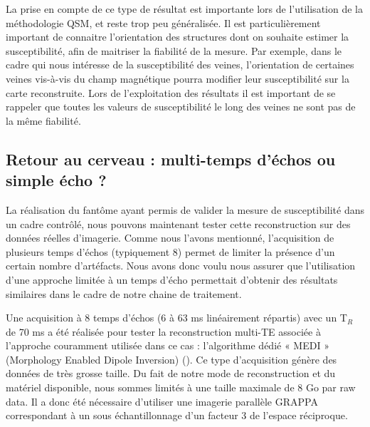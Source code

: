 {La prise en compte de ce type de résultat est importante lors de l’utilisation de la méthodologie
QSM, et reste trop peu généralisée. Il est particulièrement important de connaitre l’orientation des
structures dont on souhaite estimer la susceptibilité, afin de maitriser la fiabilité de la mesure. Par
exemple, dans le cadre qui nous intéresse de la susceptibilité des veines, l’orientation de certaines
veines vis-à-vis du champ magnétique pourra modifier leur susceptibilité sur la carte reconstruite. Lors
de l’exploitation des résultats il est important de se rappeler que toutes les valeurs de susceptibilité le
long des veines ne sont pas de la même fiabilité.
\subsection{Retour au cerveau : multi-temps d’échos ou simple écho ?}
La réalisation du fantôme ayant permis de valider la mesure de susceptibilité dans un cadre
contrôlé, nous pouvons maintenant tester cette reconstruction sur des données réelles d’imagerie.
Comme nous l’avons mentionné, l’acquisition de plusieurs temps d’échos (typiquement 8) permet de
limiter la présence d’un certain nombre d’artéfacts. Nous avons donc voulu nous assurer que
l’utilisation d’une approche limitée à un temps d’écho permettait d’obtenir des résultats similaires
dans le cadre de notre chaine de traitement.

Une acquisition à 8 temps d’échos (6 à 63 ms linéairement répartis) avec un T$_R$ de 70 ms a été
réalisée pour tester la reconstruction multi-TE associée à l’approche couramment utilisée dans ce cas :
l’algorithme dédié « MEDI » (Morphology Enabled Dipole Inversion) (\cite{Liu2011b}). Ce type d’acquisition génère
des données de très grosse taille. Du fait de notre mode de reconstruction et du matériel disponible,
nous sommes limités à une taille maximale de 8 Go par raw data. Il a donc été nécessaire d’utiliser une
imagerie parallèle GRAPPA correspondant à un sous échantillonnage d’un facteur 3 de l’espace
réciproque.

}
